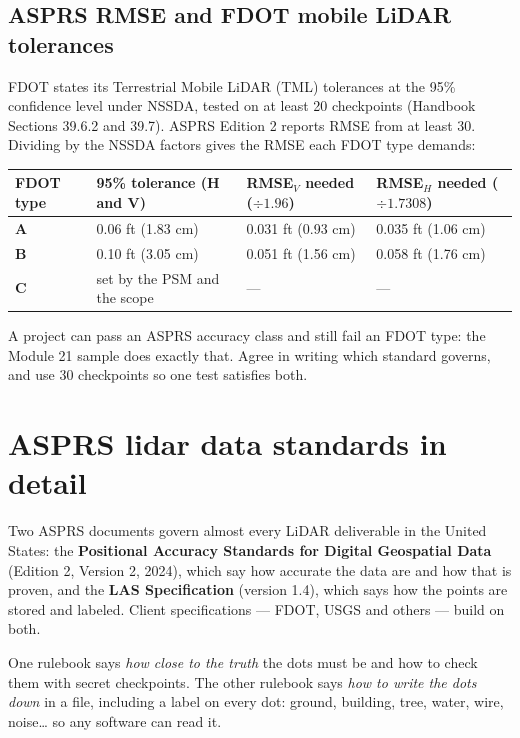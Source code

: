 \subsection*{ASPRS RMSE and FDOT mobile LiDAR tolerances}
FDOT states its Terrestrial Mobile LiDAR (TML) tolerances at the 95\% confidence level under NSSDA, tested on at least 20 checkpoints (Handbook Sections 39.6.2 and 39.7). ASPRS Edition 2 reports RMSE from at least 30. Dividing by the NSSDA factors gives the RMSE each FDOT type demands:
\begin{center}\small
\renewcommand{\arraystretch}{1.2}
\begin{tabularx}{\linewidth}{>{\bfseries}lXXX}\toprule
FDOT type & 95\% tolerance (H and V) & RMSE$_V$ needed ($\div1.96$) & RMSE$_H$ needed ($\div1.7308$)\\\midrule
A & 0.06 ft (1.83 cm) & 0.031 ft (0.93 cm) & 0.035 ft (1.06 cm)\\
B & 0.10 ft (3.05 cm) & 0.051 ft (1.56 cm) & 0.058 ft (1.76 cm)\\
C & set by the PSM and the scope & --- & ---\\\bottomrule
\end{tabularx}\end{center}
A project can pass an ASPRS accuracy class and still fail an FDOT type: the Module 21 sample does exactly that. Agree in writing which standard governs, and use 30 checkpoints so one test satisfies both.

\section{ASPRS lidar data standards in detail}
Two ASPRS documents govern almost every LiDAR deliverable in the United States: the \textbf{Positional Accuracy Standards for Digital Geospatial Data} (Edition 2, Version 2, 2024), which say how accurate the data are and how that is proven, and the \textbf{LAS Specification} (version 1.4), which says how the points are stored and labeled. Client specifications --- FDOT, USGS and others --- build on both.

\begin{kid}
One rulebook says \emph{how close to the truth} the dots must be and how to check them with secret checkpoints. The other rulebook says \emph{how to write the dots down} in a file, including a label on every dot: ground, building, tree, water, wire, noise\ldots{} so any software can read it.
\end{kid}

